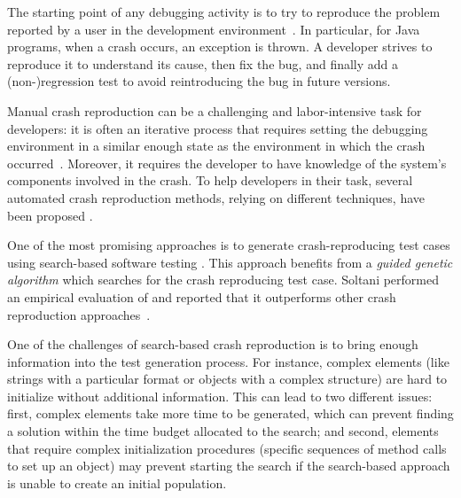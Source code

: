 


The starting point of any debugging activity is to try to reproduce the problem reported by a user in the development environment~\cite{Zeller2009,BellerICSE2018}. In particular, for Java programs, when a crash occurs, an exception is thrown. A developer strives to reproduce it to understand its cause, then fix the bug, and finally add a (non-)regression test to avoid reintroducing the bug in future versions. 

Manual crash reproduction can be a challenging and labor-intensive task for developers: it is often an iterative process that requires setting the debugging environment in a similar enough state as the environment in which the crash occurred~\cite{Zeller2009}. Moreover, it requires the developer to have knowledge of the system's components involved in the crash. 
%
%
To help developers in their task, several automated crash reproduction methods, relying on different techniques, have been proposed \cite{Chen2015, nayrolles2015jcharming, Nayrolles2017, Xuan2015, BPT17concrash, soltani2017, Soltani2018b}.

One of the most promising approaches is to generate crash-reproducing test cases using search-based software testing \cite{soltani2017, Soltani2018b}. This approach benefits from a \textit{guided genetic algorithm} which searches for the crash reproducing test case. Soltani \etal performed an empirical evaluation of \evocrash and reported that it outperforms other crash reproduction approaches~\cite{soltani2017}.

One of the challenges of search-based crash reproduction is to bring enough information into the test generation process.
For instance, complex elements (like strings with a particular format or objects with a complex structure) are hard to initialize without additional information. 
This can lead to two different issues: first, complex elements take more time to be generated, which can prevent finding a solution within the time budget allocated to the search; and second, elements that require complex initialization procedures (\eg specific sequences of method calls to set up an object) may prevent starting the search if the search-based approach is unable to create an initial population. 

